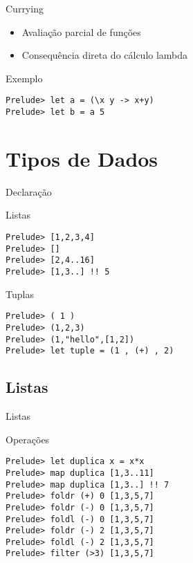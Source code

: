 \documentclass{beamer}
\begin{document}
	\begin{frame}[fragile]{Currying}
		\begin{itemize}
			\item Avaliação parcial de funções
			\item Consequência direta do cálculo lambda
		\end{itemize}
		\begin{block}{Exemplo}
		 \begin{lstlisting}
Prelude> let a = (\x y -> x+y)
Prelude> let b = a 5
		 \end{lstlisting}
		\end{block}
	\end{frame}	
	
	\section{Tipos de Dados}
	
		\begin{frame}[fragile]{Declaração}
			\begin{block}{Listas}
		\begin{lstlisting}
Prelude> [1,2,3,4]
Prelude> []
Prelude> [2,4..16]
Prelude> [1,3..] !! 5
		 \end{lstlisting}
		\end{block}
		
		\begin{block}{Tuplas}
		\begin{lstlisting}
Prelude> ( 1 )
Prelude> (1,2,3)
Prelude> (1,"hello",[1,2])
Prelude> let tuple = (1 , (+) , 2)
		 \end{lstlisting}
		\end{block}
		
		\end{frame}
	
	\subsection{Listas}
	
	\begin{frame}[fragile]{Listas}	 
		\begin{block}{Operações}	  
			\begin{lstlisting}
Prelude> let duplica x = x*x
Prelude> map duplica [1,3..11]
Prelude> map duplica [1,3..] !! 7
Prelude> foldr (+) 0 [1,3,5,7]
Prelude> foldr (-) 0 [1,3,5,7]
Prelude> foldl (-) 0 [1,3,5,7]
Prelude> foldr (-) 2 [1,3,5,7]
Prelude> foldl (-) 2 [1,3,5,7]
Prelude> filter (>3) [1,3,5,7]
			\end{lstlisting}
		\end{block}	 
	\end{frame}
	
\end{document}
